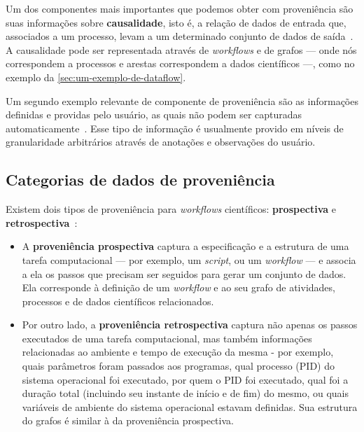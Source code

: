 Um dos componentes mais importantes que podemos obter com proveniência são suas informações sobre \textbf{causalidade}, isto é, a relação de dados de entrada que, associados a um processo, levam a um determinado conjunto de dados de saída~\cite{freire2008provenance}. A causalidade pode ser representada através de \textit{workflows} e de grafos --- onde nós correspondem a processos e arestas correspondem a dados científicos ---, como no exemplo da \autoref{sec:um-exemplo-de-dataflow}.

Um segundo exemplo relevante de componente de proveniência são as informações definidas e providas pelo usuário, as quais não podem ser capturadas automaticamente~\cite{freire2008provenance}. Esse tipo de informação é usualmente provido em níveis de granularidade arbitrários através de anotações e observações do usuário.

\subsection{Categorias de dados de proveniência}

Existem dois tipos de proveniência para \textit{workflows} científicos: \textbf{prospectiva} e \textbf{retrospectiva}~\cite{murta2014noworkflow,freire2008provenance}:

\begin{itemize}
    \item A \textbf{proveniência prospectiva} captura a especificação e a estrutura de uma tarefa computacional --- por exemplo, um \textit{script}, ou um \textit{workflow} --- e associa a ela os passos que precisam ser seguidos para gerar um conjunto de dados. Ela corresponde à definição de um \textit{workflow} e ao seu grafo de atividades, processos e de dados científicos relacionados.
    \item Por outro lado, a \textbf{proveniência retrospectiva} captura não apenas os passos executados de uma tarefa computacional, mas também informações relacionadas ao ambiente e tempo de execução da mesma - por exemplo, quais parâmetros foram passados aos programas, qual  processo (PID) do sistema operacional foi executado, por quem o PID foi executado, qual foi a duração total (incluindo seu instante de início e de fim) do mesmo, ou quais variáveis de ambiente do sistema operacional estavam definidas. Sua estrutura do grafos é similar à da proveniência prospectiva.
\end{itemize}

